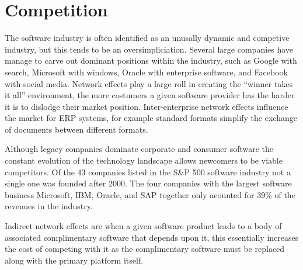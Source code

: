 \section*{Competition}

The software industry is often identified as an unusally dynamic and competive industry, but this tends to be an oversimpliciation. Several large companies have manage to carve out dominant positions within the industry, such as Google with search, Microsoft with windows, Oracle with enterprise software, and Facebook with social media.\autocite[34]{IndustrySurveysInternet}
Network effects play a large roll in creating the ``winner takes it all'' environment, the more costumers a given software provider has the harder it is to dislodge their market position.\autocite[21]{buxmann2012software}
Inter-enterprise network effects influence the market for ERP systems, for example standard formats simplify the exchange of documents between different formats.\autocite[21]{buxmann2012software}

Although legacy companies dominate corporate and consumer software the constant evolution of the technology landscape allows newcomers to be viable competitors.\autocite[38]{SurveysSoftware2015}
Of the 43 companies listed in the S\&P 500 software industry not a single one was founded after 2000.\autocite[38]{SurveysSoftware2015}
The four companies with the largest software business Microsoft, IBM, Oracle, and SAP together only acounted for 39\% of the revenues in the industry.\autocite[38]{SurveysSoftware2015}

Indirect network effects are when a given software product leads to a body of associated complimentary software that depends upon it, this essentially increases the cost of competing with it as the complimentary software must be replaced along with the primary platform itself.\autocite[21]{buxmann2012software}

